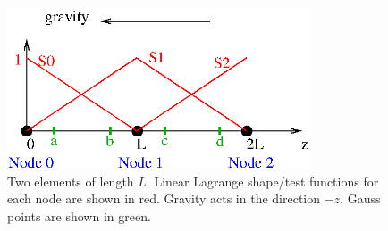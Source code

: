 \documentclass[]{scrreprt}
\begin{document}
\begin{figure}[htb]
\centering
\includegraphics[width=9cm]{eg_richards_supg.eps}
\caption{Two elements of length $L$.  Linear Lagrange shape/test
  functions for each node are shown in red.  Gravity acts in the
  direction $-z$.  Gauss points are shown in green.}
\label{eg_richards_supg.fig}
\end{figure}
\end{document}
